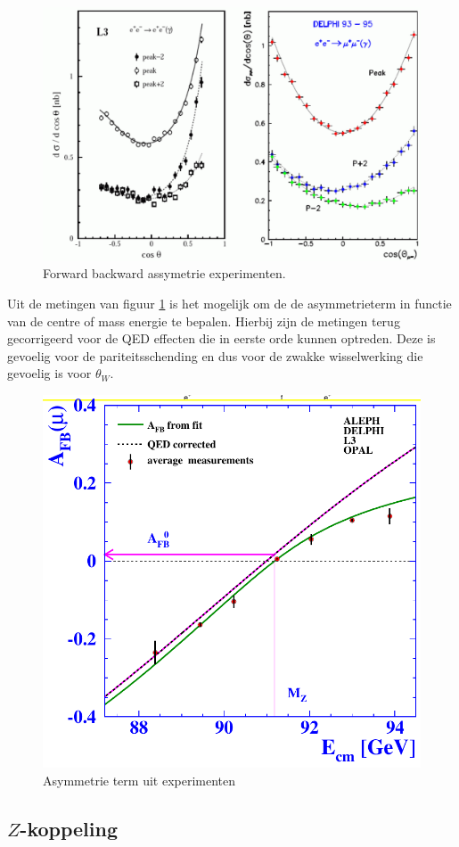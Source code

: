 \documentclass[../main.tex]{subfiles}
\begin{document}
\begin{figure}[h]
    \centering
    \includegraphics[width=0.4\linewidth]{elektroweak_precision_tests/fb_assym.png}
    \caption{Forward backward assymetrie experimenten.}%
    \label{fig:elektroweak_precision_tests/fb_assym}
\end{figure}

Uit de metingen van figuur \ref{fig:elektroweak_precision_tests/fb_assym} is het mogelijk om de de asymmetrieterm in functie van de centre of mass energie te bepalen. Hierbij zijn de metingen terug gecorrigeerd voor de QED effecten die in eerste orde kunnen optreden. Deze is gevoelig voor de pariteitsschending en dus voor de zwakke wisselwerking die gevoelig is voor $\theta_W$.

\begin{figure}[h]
    \centering
    \includegraphics[width=0.5\linewidth]{elektroweak_precision_tests/fb_term.png}
    \caption{Asymmetrie term uit experimenten}%
    \label{fig:elektroweak_precision_tests/fb_term}
\end{figure}

\subsection{$Z$-koppeling}%
\label{sub:_z_koppeling}
\end{document}
